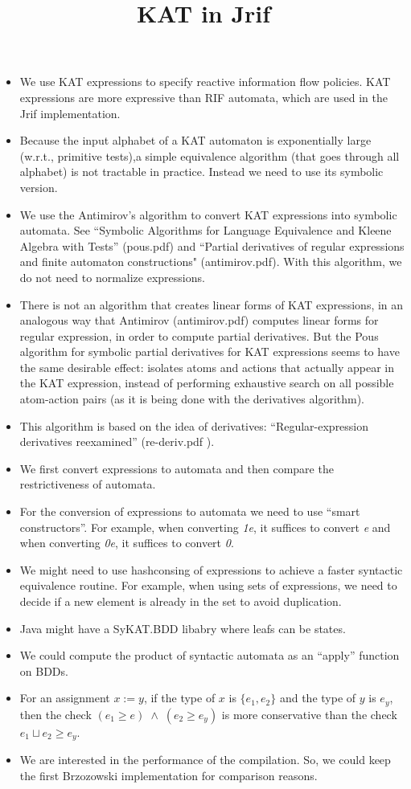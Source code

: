 \documentclass[10pt]{article}
\title{KAT in Jrif}
\begin{document}
\maketitle
\begin{itemize}
\item We use KAT expressions to specify reactive information flow policies. KAT expressions are more expressive than RIF automata, which are used in the Jrif implementation.
\item Because the input alphabet of a KAT automaton is exponentially large (w.r.t., primitive tests),a simple equivalence algorithm (that goes through all alphabet) is not tractable in practice. Instead we need to use its symbolic version.
\item We use the Antimirov's algorithm to convert KAT expressions into symbolic automata. See ``Symbolic Algorithms for Language Equivalence and Kleene Algebra with Tests'' (pous.pdf) and ``Partial derivatives of regular expressions and finite automaton constructions" (antimirov.pdf). With this algorithm, we do not need to normalize expressions.
\item There is not an algorithm that creates linear forms of KAT expressions, in an analogous way that Antimirov (antimirov.pdf) computes linear forms for regular expression, in order to compute partial derivatives. But the Pous algorithm for symbolic partial derivatives for KAT expressions seems to have the same desirable effect: isolates atoms and actions that actually appear in the KAT expression, instead of performing exhaustive search on all possible atom-action pairs (as it is being done with the derivatives algorithm).
\item This algorithm is based on the idea of derivatives: ``Regular-expression derivatives reexamined'' (re-deriv.pdf
).
\item We first convert expressions to automata and then compare the restrictiveness of automata.
\item For the conversion of expressions to automata we need to use ``smart constructors''. For example, when converting \emph{1e}, it suffices to convert \emph{e} and when converting \emph{0e}, it suffices to convert \emph{0}.
\item We might need to use hashconsing of expressions to achieve a faster syntactic equivalence routine. For example, when using sets of expressions, we need to decide if a new element is already in the set to avoid duplication.
\item Java might have a SyKAT.BDD libabry where leafs can be states.
\item We could compute the product of syntactic automata as an ``apply'' function on BDDs.
\item For an assignment $x:=y$, if the type of $x$ is $\{e_1,e_2\}$ and the type of $y$ is $e_y$, then the check $(e_1\geq e)\;\wedge\;(e_2\geq e_y)$ is more conservative than the check $e_1\sqcup e_2\geq e_y$.
\item We are interested in the performance of the compilation. So, we could keep the first Brzozowski implementation for comparison reasons.
\end{itemize}
\end{document}
